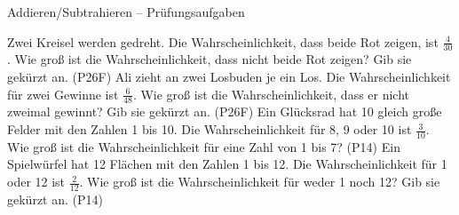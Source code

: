\begin{aufgabe}{Addieren/Subtrahieren – Prüfungsaufgaben}
\begin{teile}
\teil Zwei Kreisel werden gedreht. Die Wahrscheinlichkeit, dass beide Rot zeigen, ist $\frac{4}{30}$. Wie groß ist die Wahrscheinlichkeit, dass nicht beide Rot zeigen? Gib sie gekürzt an. \hfill (P26F)
\teil Ali zieht an zwei Losbuden je ein Los. Die Wahrscheinlichkeit für zwei Gewinne ist $\frac{6}{48}$. Wie groß ist die Wahrscheinlichkeit, dass er nicht zweimal gewinnt? Gib sie gekürzt an. \hfill (P26F)
\teil Ein Glücksrad hat 10 gleich große Felder mit den Zahlen 1 bis 10. Die Wahrscheinlichkeit für 8, 9 oder 10 ist $\frac{3}{10}$. Wie groß ist die Wahrscheinlichkeit für eine Zahl von 1 bis 7? \hfill (P14)
\teil Ein Spielwürfel hat 12 Flächen mit den Zahlen 1 bis 12. Die Wahrscheinlichkeit für 1 oder 12 ist $\frac{2}{12}$. Wie groß ist die Wahrscheinlichkeit für weder 1 noch 12? Gib sie gekürzt an. \hfill (P14)
\end{teile}
\end{aufgabe}

\medskip
{}
